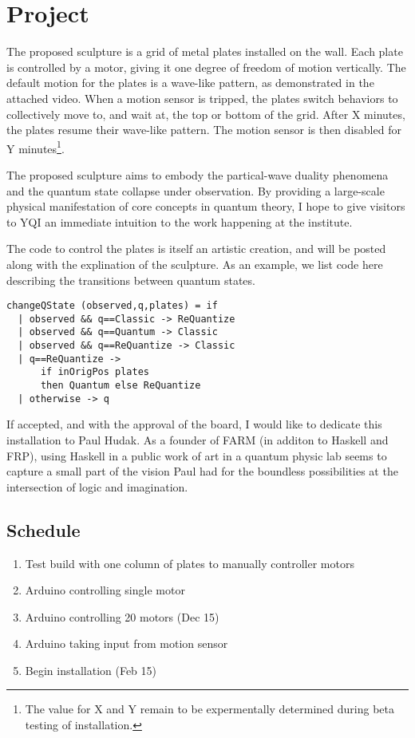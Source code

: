 \section{Project}

The proposed sculpture is a grid of metal plates installed on the wall.
Each plate is controlled by a motor, giving it one degree of freedom of motion vertically.
The default motion for the plates is a wave-like pattern, as demonstrated in the attached video.
When a motion sensor is tripped, the plates switch behaviors to collectively move to, and wait at, the top or bottom of the grid.
After X minutes, the plates resume their wave-like pattern. 
The motion sensor is then disabled for Y minutes\footnote{The value for X and Y remain to be expermentally determined during beta testing of installation.}.

The proposed sculpture aims to embody the partical-wave duality phenomena and the quantum state collapse under observation.
By providing a large-scale physical manifestation of core concepts in quantum theory, I hope to give visitors to YQI an immediate intuition to the work happening at the institute.



The code to control the plates is itself an artistic creation, and will be posted along with the explination of the sculpture.
As an example, we list code here describing the transitions between quantum states.


\begin{lstlisting}
changeQState (observed,q,plates) = if
  | observed && q==Classic -> ReQuantize
  | observed && q==Quantum -> Classic
  | observed && q==ReQuantize -> Classic
  | q==ReQuantize -> 
      if inOrigPos plates 
      then Quantum else ReQuantize
  | otherwise -> q

\end{lstlisting}


If accepted, and with the approval of the board, I would like to dedicate this installation to Paul Hudak.
As a founder of FARM (in additon to Haskell and FRP), using Haskell in a public work of art in a quantum physic lab seems to capture a small part of the vision Paul had for the boundless possibilities at the intersection of logic and imagination.

\subsection{Schedule}

\begin{enumerate}
\item Test build with one column of plates to manually controller motors
\item Arduino controlling single motor
\item Arduino controlling 20 motors (Dec 15)
\item Arduino taking input from motion sensor
\item Begin installation (Feb 15)
\end{enumerate}

